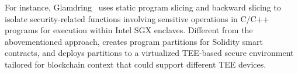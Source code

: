 For instance, Glamdring~\cite{lind2017glamdring} uses static program slicing and backward slicing to isolate security-related functions involving sensitive operations in C/C++ programs for execution within Intel SGX enclaves. 
Different from the abovementioned approach, \tool creates program partitions for Solidity smart contracts, and deploys partitions to a virtualized TEE-based secure environment tailored for blockchain context that could support different TEE devices. 


